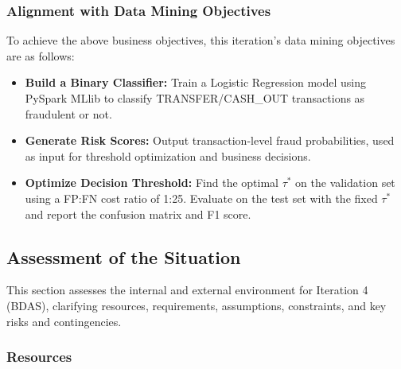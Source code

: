 \documentclass[sigplan,screen]{acmart}
\begin{document}
\subsubsection{Alignment with Data Mining Objectives}
To achieve the above business objectives, this iteration's data mining objectives are as follows:

\begin{itemize}
\item \textbf{Build a Binary Classifier:} Train a Logistic Regression model using PySpark MLlib to classify TRANSFER/CASH\_OUT transactions as fraudulent or not.
\item \textbf{Generate Risk Scores:} Output transaction-level fraud probabilities, used as input for threshold optimization and business decisions.
\item \textbf{Optimize Decision Threshold:} Find the optimal $\tau^*$ on the validation set using a FP:FN cost ratio of 1:25. Evaluate on the test set with the fixed $\tau^*$ and report the confusion matrix and F1 score.
\end{itemize}

\subsection{Assessment of the Situation}
This section assesses the internal and external environment for Iteration 4 (BDAS), clarifying resources, requirements, assumptions, constraints, and key risks and contingencies.

\subsubsection{Resources}
\end{document}
